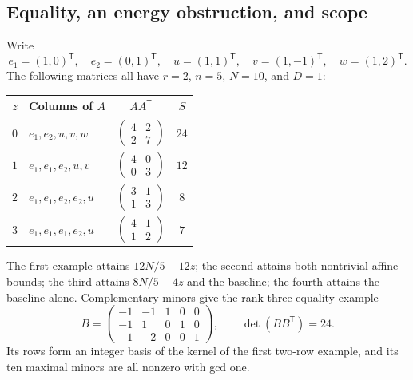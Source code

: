 \subsection{Equality, an energy obstruction, and scope}

Write
\[
 e_1=(1,0)^{\mathsf T},\quad e_2=(0,1)^{\mathsf T},\quad
 u=(1,1)^{\mathsf T},\quad v=(1,-1)^{\mathsf T},\quad
 w=(1,2)^{\mathsf T}.
\]
The following matrices all have $r=2$, $n=5$, $N=10$, and $D=1$:
\begin{center}
\renewcommand{\arraystretch}{1.3}
\begin{tabular}{c l c c}
\hline
$z$ & Columns of $A$ & $AA^{\mathsf T}$ & $S$\\
\hline
$0$ & $e_1,e_2,u,v,w$ & $\left(\begin{smallmatrix}4&2\\2&7\end{smallmatrix}\right)$ & $24$\\
$1$ & $e_1,e_1,e_2,u,v$ & $\left(\begin{smallmatrix}4&0\\0&3\end{smallmatrix}\right)$ & $12$\\
$2$ & $e_1,e_1,e_2,e_2,u$ & $\left(\begin{smallmatrix}3&1\\1&3\end{smallmatrix}\right)$ & $8$\\
$3$ & $e_1,e_1,e_1,e_2,u$ & $\left(\begin{smallmatrix}4&1\\1&2\end{smallmatrix}\right)$ & $7$\\
\hline
\end{tabular}
\end{center}
The first example attains $12N/5-12z$; the second attains both
nontrivial affine bounds; the third attains $8N/5-4z$ and the baseline;
the fourth attains the baseline alone. Complementary minors give the
rank-three equality example
\[
 B=\begin{pmatrix}
 -1&-1&1&0&0\\
 -1& 1&0&1&0\\
 -1&-2&0&0&1
 \end{pmatrix},
 \qquad \det(BB^{\mathsf T})=24.
\]
Its rows form an integer basis of the kernel of the first two-row
example, and its ten maximal minors are all nonzero with gcd one.

